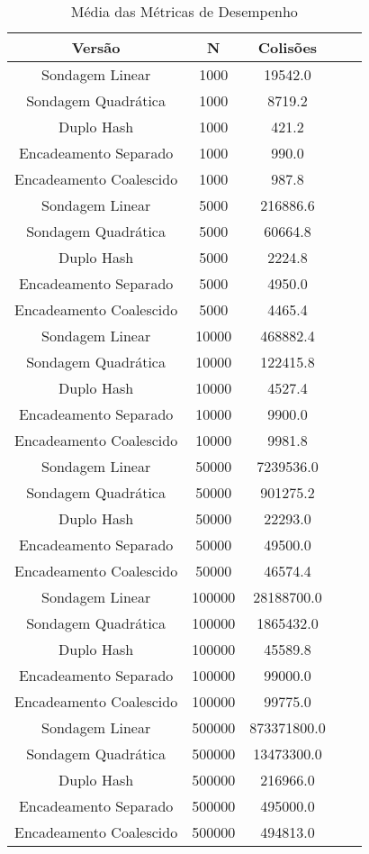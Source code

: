\begin{table}[htbp]
\caption{Média das Métricas de Desempenho}
\label{tab:table4}
\begin{tabular}{c|c|c|c|c}
\textbf{Versão} & \textbf{N} & \textbf{Colisões}\\
\hline
Sondagem Linear & 1000 & 19542.0 \\
Sondagem Quadrática & 1000 & 8719.2 \\
Duplo Hash & 1000 & 421.2 \\
Encadeamento Separado & 1000 & 990.0 \\
Encadeamento Coalescido & 1000 & 987.8 \\
Sondagem Linear & 5000 & 216886.6 \\
Sondagem Quadrática & 5000 & 60664.8 \\
Duplo Hash & 5000 & 2224.8 \\
Encadeamento Separado & 5000 & 4950.0 \\
Encadeamento Coalescido & 5000 & 4465.4 \\
Sondagem Linear & 10000 & 468882.4 \\
Sondagem Quadrática & 10000 & 122415.8 \\
Duplo Hash & 10000 & 4527.4 \\
Encadeamento Separado & 10000 & 9900.0 \\
Encadeamento Coalescido & 10000 & 9981.8 \\
Sondagem Linear & 50000 & 7239536.0 \\
Sondagem Quadrática & 50000 & 901275.2 \\
Duplo Hash & 50000 & 22293.0 \\
Encadeamento Separado & 50000 & 49500.0 \\
Encadeamento Coalescido & 50000 & 46574.4 \\
Sondagem Linear & 100000 & 28188700.0 \\
Sondagem Quadrática & 100000 & 1865432.0 \\
Duplo Hash & 100000 & 45589.8 \\
Encadeamento Separado & 100000 & 99000.0 \\
Encadeamento Coalescido & 100000 & 99775.0 \\
Sondagem Linear & 500000 & 873371800.0 \\
Sondagem Quadrática & 500000 & 13473300.0 \\
Duplo Hash & 500000 & 216966.0 \\
Encadeamento Separado & 500000 & 495000.0 \\
Encadeamento Coalescido & 500000 & 494813.0 \\
\end{tabular}
\end{table}
